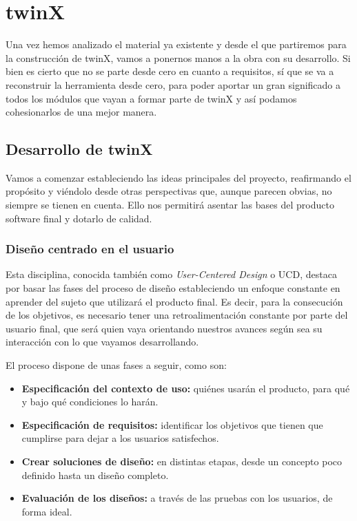 \section{twinX}

Una vez hemos analizado el material ya existente y desde el que partiremos para la construcción de twinX, vamos a ponernos manos a la obra con su desarrollo. Si bien es cierto que no se parte desde cero en cuanto a requisitos, sí que se va a reconstruir la herramienta desde cero, para poder aportar un gran significado a todos los módulos que vayan a formar parte de twinX y así podamos cohesionarlos de una mejor manera.

\subsection{Desarrollo de twinX}

Vamos a comenzar estableciendo las ideas principales del proyecto, reafirmando el propósito y viéndolo desde otras perspectivas que, aunque parecen obvias, no siempre se tienen en cuenta. Ello nos permitirá asentar las bases del producto software final y dotarlo de calidad.

\subsubsection{Diseño centrado en el usuario}

Esta disciplina, conocida también como \textit{User-Centered Design} o UCD, destaca por basar las fases del proceso de diseño estableciendo un enfoque constante en aprender del sujeto que utilizará el producto final. Es decir, para la consecución de los objetivos, es necesario tener una retroalimentación constante por parte del usuario final, que será quien vaya orientando nuestros avances según sea su interacción con lo que vayamos desarrollando.

El proceso dispone de unas fases a seguir, como son:
\begin{itemize}
	\item \textbf{Especificación del contexto de uso:} quiénes usarán el producto, para qué y bajo qué condiciones lo harán.
	\item \textbf{Especificación de requisitos:} identificar los objetivos que tienen que cumplirse para dejar a los usuarios satisfechos.
	\item \textbf{Crear soluciones de diseño:} en distintas etapas, desde un concepto poco definido hasta un diseño completo.
	\item \textbf{Evaluación de los diseños:} a través de las pruebas con los usuarios, de forma ideal.
\end{itemize}

